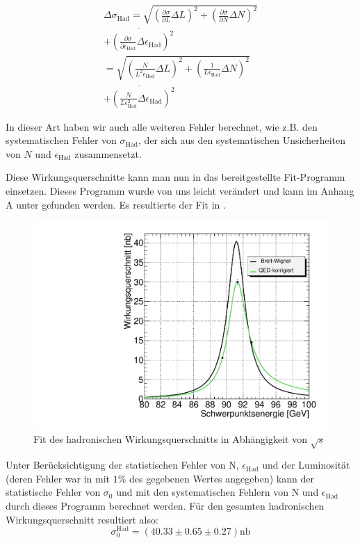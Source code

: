 \begin{equation}
  \begin{split}
    \Delta\sigma_\mathrm{Had} =  \sqrt{\left( \frac{\partial\sigma}{\partial L}\Delta L\right)^2 + \left( \frac{\partial\sigma}{\partial N}\Delta N\right)^2} \\
    \overline{+ \left( \frac{\partial\sigma}{\partial \epsilon_\mathrm{Had}}\Delta\epsilon_\mathrm{Had} \right)^2} \\
    = \sqrt{\left( \frac{N}{L^2\epsilon_\mathrm{Had}}\Delta L\right)^2 + \left( \frac{1}{L\epsilon_\mathrm{Had}}\Delta N\right)^2} \\
    \overline{+ \left( \frac{N}{L \epsilon_\mathrm{Had}^2}\Delta\epsilon_\mathrm{Had} \right)^2}
  \end{split}
\end{equation}

In dieser Art haben wir auch alle weiteren Fehler berechnet, wie z.B. den systematischen Fehler von $\sigma_\mathrm{Had}$, der sich aus den systematischen Unsicherheiten von $N$ und $\epsilon_{\mathrm{Had}}$ zusammensetzt.

Diese Wirkungsquerschnitte kann man nun in das bereitgestellte Fit-Programm einsetzen. Dieses Programm wurde von uns leicht verändert und kann im Anhang A unter  gefunden werden. Es resultierte der Fit in .\\
\begin{figure}[htb]
	\centering
	\includegraphics[width=1\columnwidth,keepaspectratio]{fit_had}
	\caption{Fit des hadronischen Wirkungsquerschnitts in Abhängigkeit von $\sqrt{s}$}
	\label{fig:hadfit}
\end{figure}
Unter Berücksichtigung der statistischen Fehler von N, $\epsilon_\mathrm{Had}$ und der Luminosität (deren Fehler war in \cite[S.9]{script} mit $1\%$ des gegebenen Wertes angegeben) kann der statistische Fehler von $\sigma_0$ und mit den systematischen Fehlern von N und $\epsilon_{\mathrm{Had}}$ durch dieses Programm berechnet werden. Für den gesamten hadronischen Wirkungsquerschnitt resultiert also:
\begin{equation}
\sigma_0^{\mathrm{Had}} = (40.33 \pm 0.65 \pm 0.27) \si{\nano\barn}
\end{equation}

